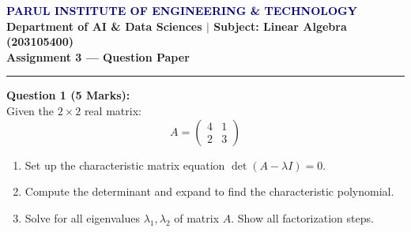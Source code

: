 \documentclass[11pt,a4paper]{article}
\begin{document}
\begin{center}
    {\large\bfseries\textcolor{navy}{PARUL INSTITUTE OF ENGINEERING \& TECHNOLOGY}}\\[0.1cm]
    {\normalsize\textbf{Department of AI \& Data Sciences $\mid$ Subject: Linear Algebra (203105400)}}\\[0.2cm]
    {\bfseries Assignment 3 --- Question Paper}
\end{center}
\hrule
\vspace{0.6cm}

\noindent\textbf{Question 1 (5 Marks):}\\
Given the $2 \times 2$ real matrix:
\[
A = \begin{pmatrix} 4 & 1 \\ 2 & 3 \end{pmatrix}
\]
\begin{enumerate}[label=(\alph*)]
    \item Set up the characteristic matrix equation $\det(A - \lambda I) = 0$.
    \item Compute the determinant and expand to find the characteristic polynomial.
    \item Solve for all eigenvalues $\lambda_1, \lambda_2$ of matrix $A$. Show all factorization steps.
\end{enumerate}
\end{document}
